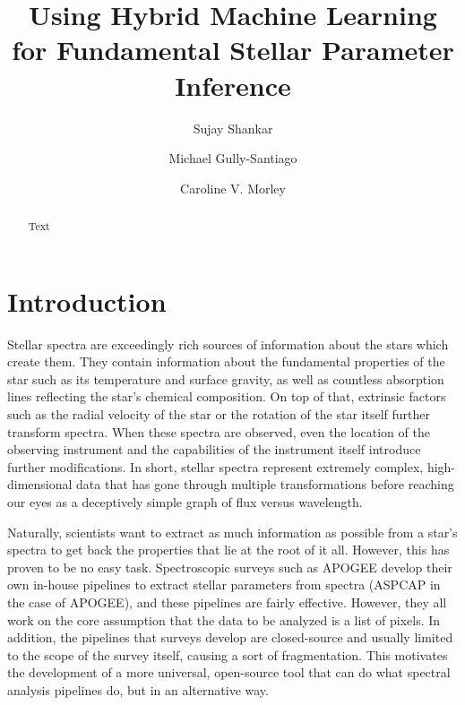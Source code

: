 \documentclass[twocolumn]{aastex631}
\begin{document}
\title{Using Hybrid Machine Learning for Fundamental Stellar Parameter Inference}
\author[0000-0002-2290-6810]{Sujay Shankar}
\author[0000-0002-4020-3457]{Michael Gully-Santiago}
\author[0000-0002-4404-0456]{Caroline V. Morley}

\begin{abstract}
    Text
\end{abstract}

\section{Introduction}
Stellar spectra are exceedingly rich sources of information about the stars
which create them. They contain information about the fundamental properties
of the star such as its temperature and surface gravity, as well as
countless absorption lines reflecting the star's chemical composition. On 
top of that, extrinsic factors such as the radial velocity of the star or 
the rotation of the star itself further transform spectra. When these spectra
are observed, even the location of the observing instrument and the 
capabilities of the instrument itself introduce further modifications. 
In short, stellar spectra represent extremely complex, high-dimensional 
data that has gone through multiple transformations before reaching our 
eyes as a deceptively simple graph of flux versus wavelength.

Naturally, scientists want to extract as much information as possible from
a star's spectra to get back the properties that lie at the root of it all. 
However, this has proven to be no easy task. Spectroscopic surveys such as 
APOGEE develop their own in-house pipelines to extract stellar parameters
from spectra (ASPCAP in the case of APOGEE), and these pipelines are fairly
effective. However, they all work on the core assumption that the data to be 
analyzed is a list of pixels. In addition, the pipelines that surveys 
develop are closed-source and usually limited to the scope of the survey 
itself, causing a sort of fragmentation. This motivates the development of a 
more universal, open-source tool that can do what spectral analysis pipelines 
do, but in an alternative way. 
\end{document}
